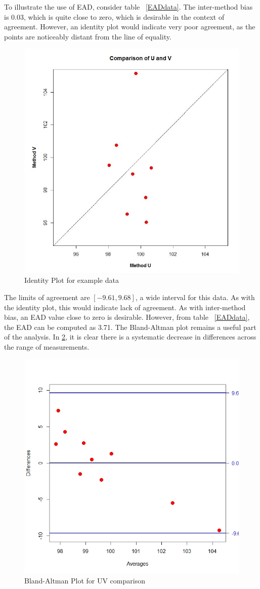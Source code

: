 \documentclass[12pt, a4paper]{report}
\theoremstyle{plain}
\theoremstyle{definition}
\theoremstyle{remark}
\begin{document}
To illustrate the use of EAD, consider table ~\ref{EADdata}. The inter-method bias is 0.03, which is quite close to zero, which is desirable in the context of agreement. However, an identity plot would indicate very poor agreement, as the points are noticeably distant from the line of equality.
\begin{figure}
	\centering
	\includegraphics[width=0.5\linewidth]{EAD-UV}
	\caption{Identity Plot for example data}
	\label{fig:EADidentity}
\end{figure}

The limits of agreement are $[-9.61, 9.68]$, a wide interval for this data. As with the identity plot, this would indicate lack of agreement. As with inter-method bias, an EAD value close to zero is desirable. However, from table ~\ref{EADdata}, the EAD can be computed as 3.71. The Bland-Altman plot remains a useful part of the analysis. In \ref{fig:EAD1}, it is clear there is a systematic decrease in differences across the range of measurements.
\begin{figure}
	\centering
	\includegraphics[width=0.5\linewidth]{images/EAD1}
	\caption{Bland-Altman Plot for UV comparison}
	\label{fig:EAD1}
\end{figure}
\end{document}
